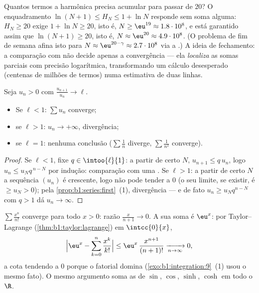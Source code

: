 \begin{example}\label{ex:b1:series:harmonicstack}
Quantos termos a  harmônica precisa acumular para passar de $20$?
O enquadramento $\ln(N+1) \leq H_N \leq 1 + \ln N$ responde sem soma alguma: $H_N \geq 20$ exige $1 + \ln N \geq 20$,
isto é, $N \geq \eu^{19} \approx 1.8\cdot10^{8}$, e está garantido
assim que $\ln(N + 1) \geq 20$, isto é, $N \approx \eu^{20} \approx
4.9\cdot10^{8}$. (O problema de fim de semana afina
isto para $N \approx
\eu^{20 - \gamma} \approx 2.7\cdot10^{8}$ via a .)
A ideia de fechamento: a comparação com  não decide apenas
a convergência --- ela \emph{localiza} as somas parciais com
precisão logarítmica, transformando um cálculo desesperado
(centenas de milhões de termos) numa estimativa de duas linhas.
\end{example}

\begin{theorem}\label{thm:b1:series:ratio}
Seja $u_n > 0$ com $\frac{u_{n+1}}{u_n} \to \ell$.
\begin{itemize}
  \item Se $\ell < 1$: $\sum u_n$ converge;
  \item se $\ell > 1$: $u_n \to +\infty$, divergência;
  \item se $\ell = 1$: nenhuma conclusão ($\sum \frac1n$ diverge, $\sum
        \frac{1}{n^2}$ converge).
\end{itemize}
\end{theorem}

\begin{proof}
Se $\ell < 1$, fixe $q \in \intoo{\ell}{1}$: a partir de certo $N$,
$u_{n+1} \leq q\,u_n$, logo $u_n \leq u_N q^{\,n-N}$ por indução:
comparação com uma . Se $\ell > 1$: a partir de certo $N$
a sequência $(u_n)$ é crescente, logo não pode tender a $0$
(o seu limite, se existir, é $\geq u_N > 0$); pela
\cref{prop:b1:series:first}~(1), divergência --- e de fato $u_n
\geq u_N q^{n-N}$ com $q > 1$ dá $u_n \to \infty$.
\end{proof}

\begin{example}\label{ex:b1:series:ratio}
$\sum \frac{x^n}{n!}$ converge para todo $x > 0$: razão
$\frac{x}{n+1} \to 0$. A sua soma é $\eu^x$: por Taylor--Lagrange
(\cref{thm:b1:taylor:lagrange}) em $\intcc{0}{x}$,
\[
\Bigl| \eu^x - \sum_{k=0}^{n} \frac{x^k}{k!} \Bigr|
\leq \eu^{x}\, \frac{x^{n+1}}{(n+1)!} \xrightarrow[n\to\infty]{} 0 ,
\]
a cota tendendo a $0$ porque o fatorial domina
(\cref{exo:b1:integration:9}~(1) usou o mesmo fato). O mesmo
argumento soma as  de $\sin$, $\cos$, $\sinh$, $\cosh$ em todo
o $\R$.
\end{example}

